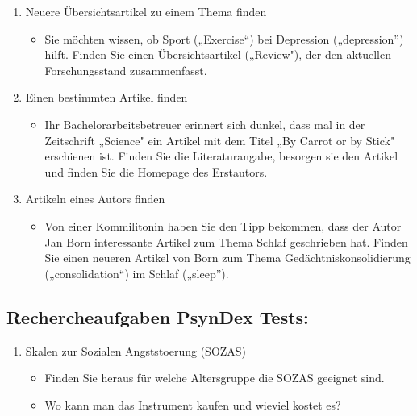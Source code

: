 \documentclass[
]{book}
\providecommand{\tightlist}{%
  \setlength{\itemsep}{0pt}\setlength{\parskip}{0pt}}
\begin{document}
\begin{enumerate}
\def\labelenumi{\arabic{enumi}.}
\item
  Neuere Übersichtsartikel zu einem Thema finden

  \begin{itemize}
  \tightlist
  \item
    Sie möchten wissen, ob Sport („Exercise``) bei Depression („depression'') hilft. Finden Sie einen Übersichtsartikel („Review"), der den aktuellen Forschungsstand zusammenfasst. \smallskip
  \end{itemize}
\item
  Einen bestimmten Artikel finden

  \begin{itemize}
  \tightlist
  \item
    Ihr Bachelorarbeitsbetreuer erinnert sich dunkel, dass mal in der Zeitschrift „Science" ein Artikel mit dem Titel „By Carrot or by Stick" erschienen ist. Finden Sie die Literaturangabe, besorgen sie den Artikel und finden Sie die Homepage des Erstautors. \smallskip
  \end{itemize}
\item
  Artikeln eines Autors finden

  \begin{itemize}
  \tightlist
  \item
    Von einer Kommilitonin haben Sie den Tipp bekommen, dass der Autor Jan Born interessante Artikel zum Thema Schlaf geschrieben hat. Finden Sie einen neueren Artikel von Born zum Thema Gedächtniskonsolidierung („consolidation``) im Schlaf („sleep'').
  \end{itemize}
\end{enumerate}

\hypertarget{rechercheaufgaben-psyndex-tests}{%
\subsection{Rechercheaufgaben PsynDex Tests:}\label{rechercheaufgaben-psyndex-tests}}

\begin{enumerate}
\def\labelenumi{\arabic{enumi}.}
\item
  Skalen zur Sozialen Angststoerung (SOZAS)

  \begin{itemize}
  \tightlist
  \item
    Finden Sie heraus für welche Altersgruppe die SOZAS geeignet sind.
  \item
    Wo kann man das Instrument kaufen und wieviel kostet es?
  \end{itemize}
\end{enumerate}
\end{document}
